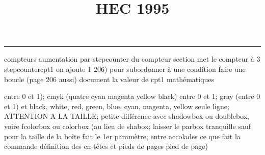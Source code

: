 \documentclass[11pt]{article}%
\title{\bf \vspace{-1cm} HEC 1995} %
\author{} %
\date{} %
\renewcommand{\headrulewidth}{0pt}%
\renewcommand{\footrulewidth}{0.4pt}%
\begin{document}
\maketitle %
\vspace{-1.2cm}\hrule %
\thispagestyle{fancy}

\vspace*{.4cm}


compteurs%
aumentation par stepcounter du compteur section%
met le compteur à 3%
stepcounter{cpt1} on ajoute 1%
206) pour subordonner à une condition %
faire une boucle (page 206 aussi) %
document la valeur de cpt1 
mathématiques\newcommand{\ch}{\operatorname{ch}} 
\newcommand{\sh}{\operatorname{sh}}
\renewcommand{\tanh}{\operatorname{th}}
\renewcommand{\sinh}{\operatorname{sh}}
\renewcommand{\cosh}{\operatorname{ch}}
\newcommand{\argsh}{\operatorname{argsh}}
\newcommand{\argch}{\operatorname{argch}}
\newcommand{\argth}{\operatorname{argth}}
\newcommand{\Id}{\operatorname{Id}}
\renewcommand{\leq}{\leq}
\renewcommand{\geq}{\geq }

\newcommand{\dlim}{\lim}
\newcommand{\dsum}{\sum}
\newcommand{\dprod}{\prod}



entre 0 et 1); cmyk (quatre cyan magenta yellow black) entre 0 et 1;
gray (entre 0 et 1) et black, white, red, green, blue, cyan, magenta,
yellow%
seule ligne; ATTENTION A LA TAILLE; petite différence avec shadowbox ou
doublebox, voire fcolorbox ou colorbox (au lieu de shabox; laisser le
parbox tranquille sauf pour la taille de la boîte
\newcommand{\Tbox}[1]{\begin{center} \shabox{\parbox{0.6
\linewidth}{#1}} \end{center}} %
fait le 1er paramètre; entre accolades ce que fait la commande
définition des en-têtes et pieds de pages\pagestyle{fancy}
\chead{}
\rfoot[ \ \thepage]{\thepage}
\cfoot{}
\lfoot{}
\thispagestyle{fancy} %
pied de page)\renewcommand{\footrulewidth}{0.4pt}
\renewcommand{\headrulewidth}{0.4pt}
\end{document}
